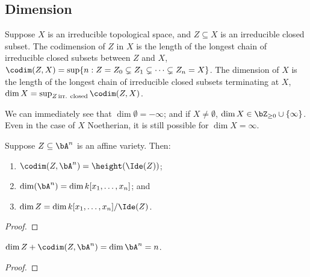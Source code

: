 \subsection*{Dimension}

\begin{definition}
    Suppose \(X\) is an irreducible topological space,
    and \(Z \subseteq X\) is an irreducible closed subset.
    The codimension of \(Z\) in \(X\)
    is the length of the longest chain of irreducible closed subsets between \(Z\) and \(X\),
    \(\codim(Z,X) = \sup\{n: Z = Z_0 \subsetneq Z_1 \subsetneq \cdots \subsetneq Z_n = X\}\).
    The dimension of \(X\) is the length of the longest chain of irreducible closed subsets terminating at \(X\),
    \(\dim X = \sup_{Z\,\text{irr. closed}} \codim(Z,X)\).
\end{definition}
\begin{remark}
    We can immediately see that \(\dim\emptyset = -\infty\);
    and if \(X \neq \emptyset\),
    \(\dim X \in \bZ_{\geq 0} \cup \{\infty\}\).
    Even in the case of \(X\) Noetherian, it is still possible for \(\dim X = \infty\).
\end{remark}
\begin{lemma}
    Suppose \(Z \subseteq \bA^n\) is an affine variety.
    Then:
    \begin{enumerate}[label={(\alph*)}, itemsep=0mm]
        \item \(\codim(Z,\bA^n) = \height(\Ide(Z))\);
        \item \(\dim(\bA^n) = \dim k[x_1,\hdots,x_n]\); and
        \item \(\dim Z = \dim k[x_1,\hdots,x_n]/\Ide(Z)\).
    \end{enumerate}
\end{lemma}
\begin{proof}
    
\end{proof}
\begin{corollary}
    \(\dim Z + \codim(Z,\bA^n) = \dim \bA^n = n\).
\end{corollary}
\begin{proof}
    
\end{proof}



